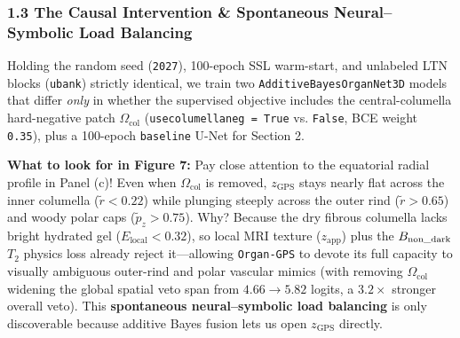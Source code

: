 \documentclass[10pt,a4paper]{article}
\renewcommand{\_}{\origunderscore\allowbreak}
\begin{document}
\subsubsection*{1.3 The Causal Intervention \& Spontaneous Neural--Symbolic Load Balancing}
Holding the random seed (\texttt{2027}), 100-epoch SSL warm-start, and unlabeled LTN blocks (\texttt{ubank}) strictly identical, we train two \texttt{AdditiveBayesOrganNet3D} models that differ \textit{only} in whether the supervised objective includes the central-columella hard-negative patch $\Omega_{\text{col}}$ (\texttt{use\_columella\_neg = True} vs. \texttt{False}, BCE weight \texttt{0.35}), plus a 100-epoch \texttt{baseline} U-Net for Section 2.

\textbf{What to look for in Figure 7:} Pay close attention to the equatorial radial profile in Panel (c)! Even when $\Omega_{\text{col}}$ is removed, $z_{\text{GPS}}$ stays nearly flat across the inner columella ($\tilde{r} < 0.22$) while plunging steeply across the outer rind ($\tilde{r} > 0.65$) and woody polar caps ($\tilde{p}_z > 0.75$). Why? Because the dry fibrous columella lacks bright hydrated gel ($E_{\text{local}} < 0.32$), so local MRI texture ($z_{\text{app}}$) plus the $B_{\text{non\_dark}}$ $T_2$ physics loss already reject it---allowing \texttt{Organ-GPS} to devote its full capacity to visually ambiguous outer-rind and polar vascular mimics (with removing $\Omega_{\text{col}}$ widening the global spatial veto span from $4.66 \to 5.82$ logits, a $3.2\times$ stronger overall veto). This \textbf{spontaneous neural--symbolic load balancing} is only discoverable because additive Bayes fusion lets us open $z_{\text{GPS}}$ directly.
\end{document}
